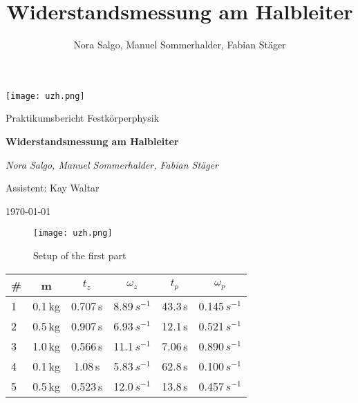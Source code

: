 \documentclass[a4paper]{scrartcl}
\title{Widerstandsmessung am Halbleiter}
\author{Nora Salgo, Manuel Sommerhalder, Fabian Stäger}
\begin{document}
\begin{titlepage}
	\centering
	\texttt{[image: uzh.png]}\par\vspace{1cm}
	\vspace{1cm}
	{\Large Praktikumsbericht Festkörperphysik\par}
	\vspace{1.5cm}
	{\huge\bfseries Widerstandsmessung am Halbleiter\par}
	\vspace{2cm}
	{\Large\itshape Nora Salgo, Manuel Sommerhalder, Fabian Stäger \par\vspace{1cm}
	Assistent: Kay Waltar}
	\vfill
	

	\vfill

	{\large \today\par}
\end{titlepage}


\begin{figure}[htbp]
\centering
\texttt{[image: uzh.png]}
\caption{Setup of the first part}
\label{setup1}
\end{figure}
%






\begin{tabular}{lccccc}
	\hline
	\# & m & $t_{z}$ & $\omega_{z}$ & $t_{p}$ & $\omega_{p}$ \\
	\hline
	1 & 0.1\,kg & 0.707\,s & 8.89\,$s^{-1}$ & 43.3\,s & 0.145\,$s^{-1}$\\
	2 & 0.5\,kg & 0.907\,s & 6.93\,$s^{-1}$ & 12.1\,s & 0.521\,$s^{-1}$\\
	3 & 1.0\,kg & 0.566\,s & 11.1\,$s^{-1}$ & 7.06\,s & 0.890\,$s^{-1}$\\
	4 & 0.1\,kg & 1.08\,s & 5.83\,$s^{-1}$ & 62.8\,s & 0.100\,$s^{-1}$\\
	5 & 0.5\,kg & 0.523\,s & 12.0\,$s^{-1}$ & 13.8\,s & 0.457\,$s^{-1}$\\
\end{tabular}\\
\end{document}
